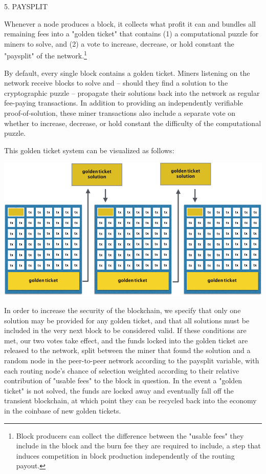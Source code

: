 \documentclass[11.5pt, oneside]{article}   	%
\begin{document}
\begin{multicols}{2}
5. PAYSPLIT

Whenever a node produces a block, it collects what profit it can and bundles all remaining fees into a "golden ticket" that contains (1) a computational puzzle for miners to solve, and (2) a vote to increase, decrease, or hold constant the "paysplit" of the network.\footnote[2]{Block producers can collect the difference between the "usable fees" they include in the block and the burn fee they are required to include, a step that induces competition in block production independently of the routing payout.}

By default, every single block contains a golden ticket. Miners listening on the network receive blocks to solve and -- should they find a solution to the cryptographic puzzle -- propagate their solutions back into the network as regular fee-paying transactions. In addition to providing an independently verifiable proof-of-solution, these miner transactions also include a separate vote on whether to increase, decrease, or hold constant the difficulty of the computational puzzle.

This golden ticket system can be visualized as follows:

\includegraphics[width=.45\textwidth]{saito7.jpeg}

In order to increase the security of the blockchain, we specify that only one solution may be provided for any golden ticket, and that all solutions must be included in the very next block to be considered valid. If these conditions are met, our two votes take effect, and the funds locked into the golden ticket are released to the network, split between the miner that found the solution and a random node in the peer-to-peer network according to the paysplit variable, with each routing node's chance of selection weighted according to their relative contribution of "usable fees" to the block in question. In the event a "golden ticket" is not solved, the funds are locked away and eventually fall off the transient blockchain, at which point they can be recycled back into the economy in the coinbase of new golden tickets.


\end{multicols}
\end{document}
